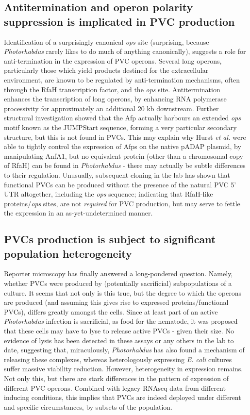 \subsection{Antitermination and operon polarity suppression is implicated in PVC production}
Identification of a surprisingly canonical \emph{ops} site (surprising, because \emph{Photorhabdus} rarely likes to do much of anything canonically), suggests a role for anti-termination in the expression of PVC operons. Several long operons, particularly those which yield products destined for the extracellular environment, are known to be regulated by anti-termination mechanisms, often through the RfaH transcription factor, and the \emph{ops} site. Antitermination enhances the transcription of long operons, by enhancing RNA polymerase processivity for approximately an additional 20 kb downstream. Further structural investigation showed that the Afp actually harbours an extended \emph{ops} motif known as the JUMPStart sequence, forming a very particular secondary structure, but this is not found in PVCs. This may explain why Hurst \emph{et al.} were able to tightly control the expression of Afps on the native pADAP plasmid, by manipulating AnfA1, but no equivalent protein (other than a chromosomal copy of RfaH) can be found in \emph{Photorhabdus} - there may actually be subtle differences to their regulation. Unusually, subsequent cloning in the lab has shown that functional PVCs can be produced without the presence of the natural PVC 5' UTR altogether, including the \emph{ops} sequence; indicating that RfaH-like proteins/\emph{ops} sites, are not \emph{required} for PVC production, but may serve to fettle the expression in an as-yet-undetermined manner.

\subsection{PVCs production is subject to significant population heterogeneity}
Reporter microscopy has finally answered a long-pondered question. Namely, whether PVCs were produced by (potentially sacrificial) subpopulations of a culture. It seems that not only is this true, but the degree to which the operons are produced (and assuming this gives rise to expressed proteins/functional PVCs), differs greatly amongst the cells. Since at least part of an active \emph{Photorhabdus} infection is sacrificial, as food for the nematode, it was proposed that these cells may have to lyse to release active PVCs - given their size. No evidence of lysis has been detected in these assays or any others in the lab to date, suggesting that, miraculously, \emph{Photorhabdus} has also found a mechanism of releasing these complexes, whereas heterologously expressing \emph{E. coli} cultures suffer massive viability reduction. However, heterogeneity in expression remains. Not only this, but there are stark differences in the pattern of expression of different PVC operons. Combined with legacy RNAseq data from different inducing conditions, this implies that PVCs are indeed deployed under different and specific circumstances, by subsets of the population.



